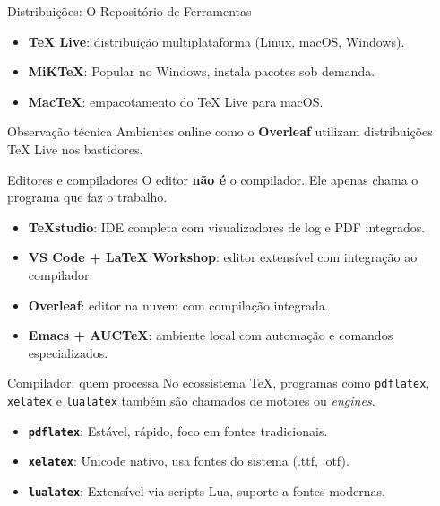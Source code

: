 \documentclass[handout]{beamer}
\begin{document}
\begin{frame}{Distribuições: O Repositório de Ferramentas}
    \begin{itemize}
        \item \textbf{TeX Live}: distribuição multiplataforma (Linux, macOS, Windows).
        \item \textbf{MiKTeX}: Popular no Windows, instala pacotes sob demanda.
        \item \textbf{MacTeX}: empacotamento do TeX Live para macOS.
    \end{itemize}
    \vfill
    \begin{block}{Observação técnica}
        Ambientes online como o \textbf{Overleaf} utilizam distribuições TeX Live nos bastidores.
    \end{block}
\end{frame}

\begin{frame}{Editores e compiladores}
    O editor \textbf{não é} o compilador. Ele apenas chama o programa que faz o trabalho.
    \begin{itemize}
        \item \textbf{TeXstudio}: IDE completa com visualizadores de log e PDF integrados.
        \item \textbf{VS Code + LaTeX Workshop}: editor extensível com integração ao compilador.
        \item \textbf{Overleaf}: editor na nuvem com compilação integrada.
        \item \textbf{Emacs + AUCTeX}: ambiente local com automação e comandos especializados.
    \end{itemize}
\end{frame}

\begin{frame}{Compilador: quem processa}
    No ecossistema TeX, programas como \texttt{pdflatex}, \texttt{xelatex} e \texttt{lualatex} também são chamados de motores ou \textit{engines}.
    \begin{itemize}
        \item \textbf{\texttt{pdflatex}}: Estável, rápido, foco em fontes tradicionais.
        \item \textbf{\texttt{xelatex}}: Unicode nativo, usa fontes do sistema (.ttf, .otf).
        \item \textbf{\texttt{lualatex}}: Extensível via scripts Lua, suporte a fontes modernas.
    \end{itemize}
\end{frame}
\end{document}

